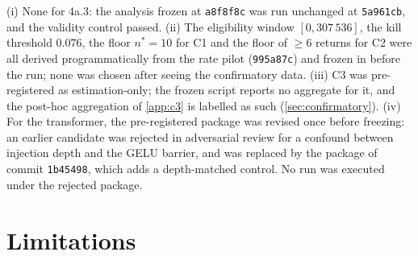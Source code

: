 \documentclass[11pt]{article}
\theoremstyle{definition}
\theoremstyle{remark}
\begin{document}
(i) None for 4a.3: the analysis frozen at \texttt{a8f8f8c} was run unchanged at
\texttt{5a961cb}, and the validity control passed.
(ii) The eligibility window $[0,307\,536]$, the kill threshold $0.076$, the
floor $n^\ast=10$ for C1 and the floor of $\ge6$ returns for C2 were all derived
programmatically from the rate pilot (\texttt{995a87c}) and frozen in
 before the run; none was chosen after seeing the
confirmatory data.
(iii) C3 was pre-registered as estimation-only; the frozen script reports no
aggregate for it, and the post-hoc aggregation of \cref{app:c3} is labelled as
such (\cref{sec:confirmatory}).
(iv) For the transformer, the pre-registered package was revised once before
freezing: an earlier candidate was rejected in adversarial review for a
confound between injection depth and the GELU barrier, and was replaced by the
package of commit \texttt{1b45498}, which adds a depth-matched control. No run
was executed under the rejected package.

\section{Limitations}\label{sec:limits}
\end{document}
